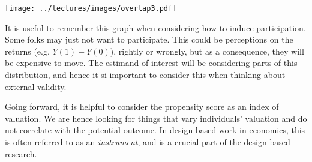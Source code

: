 \documentclass{tufte-handout}
\theoremstyle{break}
\begin{document}
\begin{figure*}
  \label{fig:overlap2}
  \texttt{[image: ../lectures/images/overlap3.pdf]}
  \end{figure*}

It is useful to remember this graph when considering how to induce participation. Some folks may just not want to participate. This could be perceptions on the returns (e.g. $Y(1) - Y(0)$), rightly or wrongly, but as a consequence, they  will be expensive to move. The estimand of interest will be considering parts of this distribution, and hence it si important to consider this when thinking about external validity.

Going forward, it is helpful to consider the propensity score as an index of valuation. We are hence looking for things that vary individuals' valuation and do not correlate with the potential outcome. In design-based work in economics, this is often referred to as an \emph{instrument}, and is a crucial part of the design-based research. 





\end{document}
